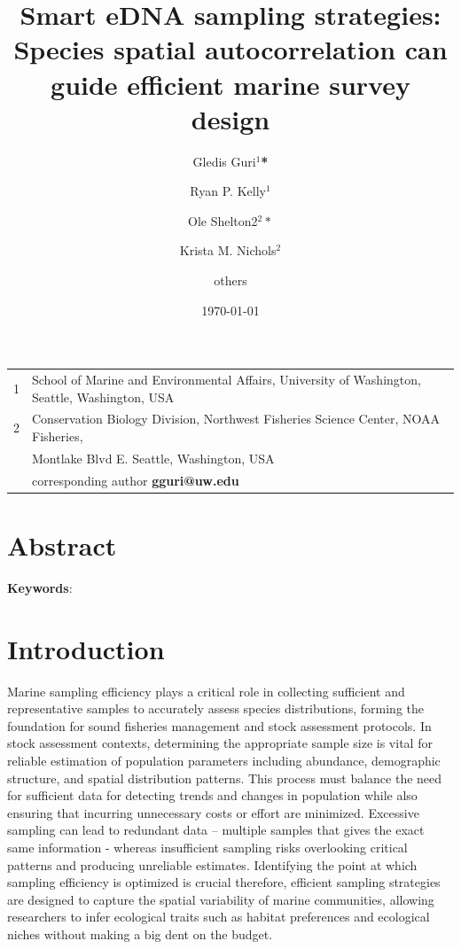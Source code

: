 \documentclass{article}
\title{Smart eDNA sampling strategies: Species spatial autocorrelation can guide efficient marine survey design}
\author{Gledis Guri$^1$\textbf{*} \and
Ryan P. Kelly$^1$ \and
Ole Shelton2$^2*$ \and
Krista M. Nichols$^2$ \and others}
\date{\today}
\begin{document}
\maketitle

\section*{}

\begin{center}
\begin{tabular}{ll}
1 & School of Marine and Environmental Affairs, University of Washington, Seattle, Washington, USA \\
2 & Conservation Biology Division, Northwest Fisheries Science Center, NOAA Fisheries, \\
 & \qquad 2715 Montlake Blvd E. Seattle, Washington, USA \\
\hline
& corresponding author \textbf{gguri@uw.edu}
\end{tabular}
\end{center}

\section*{Abstract}

\textbf{Keywords}: 















\section{Introduction}
Marine sampling efficiency plays a critical role in collecting sufficient and representative samples to accurately assess species distributions, forming the foundation for sound fisheries management and stock assessment protocols. In stock assessment contexts, determining the appropriate sample size is vital for reliable estimation of population parameters including abundance, demographic structure, and spatial distribution patterns. This process must balance the need for sufficient data for detecting trends and changes in population while also ensuring that incurring unnecessary costs or effort are minimized. Excessive sampling can lead to redundant data -- multiple samples that gives the exact same information - whereas insufficient sampling risks overlooking critical patterns and producing unreliable estimates. Identifying the point at which sampling efficiency is optimized is crucial therefore, efficient sampling strategies are designed to capture the spatial variability of marine communities, allowing researchers to infer ecological traits such as habitat preferences and ecological niches without making a big dent on the budget.
\end{document}
